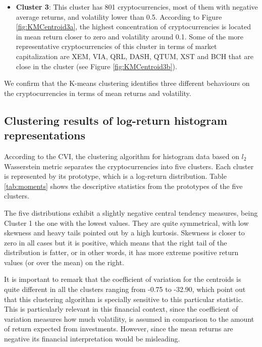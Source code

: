 \documentclass{bmcart}
\begin{document}
\begin{itemize}
	\item \textbf{Cluster 3}: This cluster has 801 cryptocurrencies, most of them with negative average returns, and  volatility lower than 0.5. According to Figure \ref{fig:KMCentroid3a}, the highest concentration of cryptocurrencies is located in mean return closer to zero and volatility around 0.1. Some of the more representative cryptocurrencies of this cluster in terms of market capitalization are XEM, VIA, QRL, DASH, QTUM, XST and BCH that are close in the cluster (see Figure \ref{fig:KMCentroid3b}).\\
	
	
\end{itemize}

We confirm that the K-means clustering identifies three different behaviours on the cryptocurrencies in terms of mean returns and volatility.


\subsection*{Clustering results of log-return histogram representations}

According to the  CVI, the clustering algorithm for histogram data based on $l_2$ Wasserstein metric \cite{HistDAWass} separates the cryptocurrencies into five clusters. Each cluster is represented by its prototype, which is a log-return distribution. Table \ref{tab:moments} shows the descriptive statistics from the prototypes of the five clusters. 

The five distributions exhibit a slightly negative central tendency measures, being Cluster 1 the one with the lowest values. They are quite symmetrical, with low skewness and heavy tails pointed out by a high kurtosis. Skewness is closer to zero in all cases but it is positive, which means that the right tail of the distribution is fatter, or in other words, it has more extreme positive return values (or over the mean) on the right. 

It is important to remark that the coefficient of variation for the centroids is quite different in all the clusters ranging from -0.75 to -32.90, which point out that this clustering algorithm is specially sensitive to this particular statistic. This is particularly relevant in this financial context, since the coefficient of variation measures how much volatility, is assumed in comparison to the amount of return expected from investments. However, since the mean returns are negative its financial interpretation would be misleading. 
\end{document}
